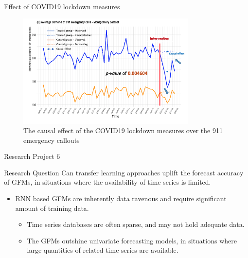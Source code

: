 \documentclass{beamer}
\begin{document}
\begin{frame}{Effect of COVID19 lockdown measures}
\begin{figure}[htbp]
\centerline{\includegraphics[width=0.80\textwidth]{images/911calls}}
\caption{ \scriptsize The causal effect of the COVID19 lockdown measures over the 911 emergency callouts}
\label{causal}
\end{figure}
\end{frame}




\begin{frame}{Research Project 6}
   \begin{block}{Research Question}	
	Can transfer learning approaches uplift the forecast accuracy of GFMs, in situations where the availability of time series is limited.
	\end{block}
	\begin{itemize}
	\item RNN based GFMs are inherently data ravenous and require significant amount of training data. 
	\vspace{3mm}
		\begin{itemize}
		\item \color{blue} Time series databases are often sparse, and may not hold adequate data.
		\item \color{blue} The GFMs outshine univariate forecasting models, in situations where large quantities of related time series are available.
		\end{itemize}
 \end{itemize}
\end{frame}
\end{document}
